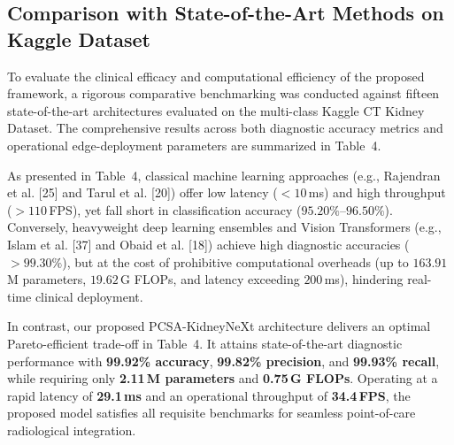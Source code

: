 
\subsection{Comparison with State-of-the-Art Methods on Kaggle Dataset}

To evaluate the clinical efficacy and computational efficiency of the proposed framework, a rigorous comparative benchmarking was conducted against fifteen state-of-the-art architectures evaluated on the multi-class Kaggle CT Kidney Dataset. The comprehensive results across both diagnostic accuracy metrics and operational edge-deployment parameters are summarized in Table~4.

As presented in Table~4, classical machine learning approaches (e.g., Rajendran et al. [25] and Tarul et al. [20]) offer low latency ($<10$\,ms) and high throughput ($>110$\,FPS), yet fall short in classification accuracy ($95.20\%$--$96.50\%$). Conversely, heavyweight deep learning ensembles and Vision Transformers (e.g., Islam et al. [37] and Obaid et al. [18]) achieve high diagnostic accuracies ($>99.30\%$), but at the cost of prohibitive computational overheads (up to $163.91$\,M parameters, $19.62$\,G FLOPs, and latency exceeding $200$\,ms), hindering real-time clinical deployment. 

In contrast, our proposed PCSA-KidneyNeXt architecture delivers an optimal Pareto-efficient trade-off in Table~4. It attains state-of-the-art diagnostic performance with \textbf{99.92\% accuracy}, \textbf{99.82\% precision}, and \textbf{99.93\% recall}, while requiring only \textbf{2.11\,M parameters} and \textbf{0.75\,G FLOPs}. Operating at a rapid latency of \textbf{29.1\,ms} and an operational throughput of \textbf{34.4\,FPS}, the proposed model satisfies all requisite benchmarks for seamless point-of-care radiological integration.

